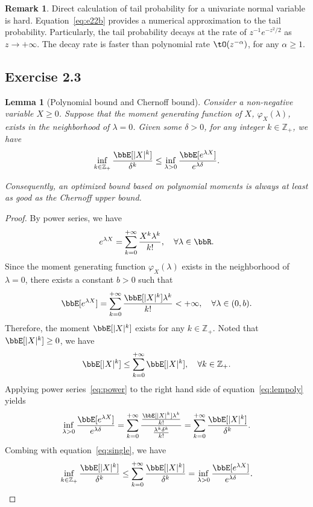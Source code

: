 \documentclass[11pt]{article}
\theoremstyle{plain}
\newtheorem{lem}{Lemma}
\theoremstyle{definition}
\newtheorem{rmk}{Remark}
\begin{document}
\begin{rmk}
	Direct calculation of tail probability for a univariate normal variable is hard. Equation~\eqref{eq:e22b} provides a numerical approximation to the tail probability. Particularly, the tail probability decays at the rate of $z^{-1}e^{-z^2/2}$ as $z \rightarrow +\infty$. The decay rate is faster than polynomial rate $\tO(z^{-\alpha})$, for any $\alpha \geq 1$.
\end{rmk}

\subsection{Exercise 2.3}

\begin{lem}[Polynomial bound and Chernoff bound]\label{lem:momcher}
	Consider a non-negative variable $X \geq 0$. Suppose that the moment generating function of $X$, $\varphi_{X}(\lambda)$, exists in the neighborhood of $\lambda = 0$. Given some $\delta > 0$, for any integer $ k \in \mathbb{Z_+}$, we have
	\begin{equation}\label{eq:lempoly}
		\inf_{k \in \mathbb{Z_+} } \frac{\bbE[|X|^k]}{\delta^k} \leq \inf_{\lambda >0} \frac{\bbE[e^{\lambda X}]}{e^{\lambda \delta}}. 
	\end{equation}
	  
	Consequently, an optimized bound based on polynomial moments is always at least as good as the Chernoff upper bound.
\end{lem}

\begin{proof}
	By power series, we have
	\begin{equation}\label{eq:power}
		 e^{\lambda X} = \sum_{k = 0}^{+\infty } \frac{X^k \lambda^k }{k!}, \quad \forall \lambda \in \bbR.
	\end{equation}
	Since the moment generating function $\varphi_X(\lambda)$ exists in the neighborhood of $\lambda = 0$, there exists a constant $b > 0$ such that 
		\[   \bbE [e^{\lambda X} ]= \sum_{k = 0}^{+\infty } \frac{ \bbE[|X|^k]  \lambda^k }{k!} < +\infty,\quad \forall \lambda \in (0,b). \]
	Therefore, the moment  $\bbE[|X|^k]$ exists for any $ k \in \mathbb{Z_+}$. Noted that  $\bbE[|X|^k] \geq 0$, we have
	\begin{equation}\label{eq:single}
		 \bbE[|X|^k] \leq \sum_{k = 0}^{+\infty}  \bbE[|X|^k], \quad \forall k \in \mathbb{Z_+}. 
	\end{equation}
	Applying power series~\eqref{eq:power} to the right hand side of equation~\eqref{eq:lempoly} yields
	\begin{equation}\label{eq:powertopoly}
		\inf_{\lambda >0} \frac{\bbE[e^{\lambda X}]}{e^{\lambda \delta}} = \sum_{k = 0}^{+\infty } \frac{\frac{ \bbE[|X|^k]  \lambda^k }{k!} }{\frac{\lambda^k \delta^k }{k!}  } =\sum_{k = 0}^{+\infty } \frac{ \bbE[|X|^k] }{\delta^k}.
	\end{equation}
	Combing with equation~\eqref{eq:single}, we have
	\[  \inf_{k \in \mathbb{Z_+} } \frac{\bbE[|X|^k]}{\delta^k} \leq \sum_{k = 0}^{+\infty } \frac{ \bbE[|X|^k] }{\delta^k}  = \inf_{\lambda > 0} \frac{\bbE[e^{\lambda X}]}{e^{\lambda \delta}}. \]
\end{proof}
\end{document}
